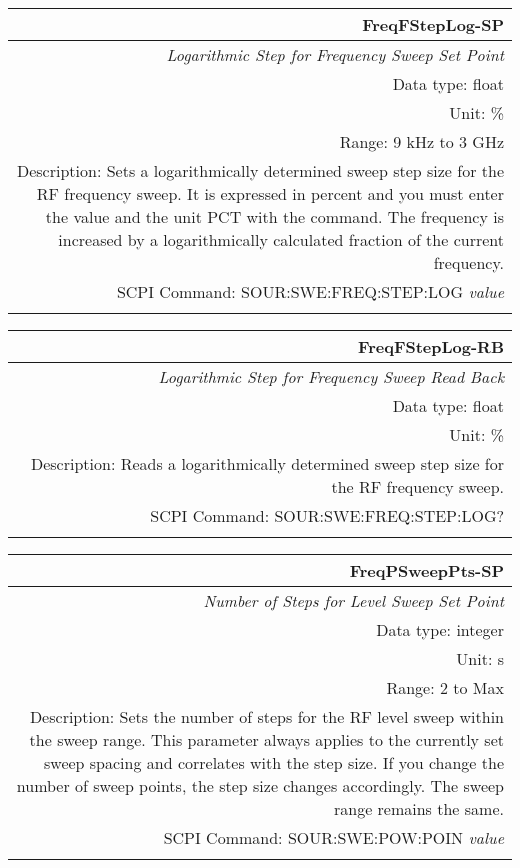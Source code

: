 \documentclass[openany]{article}
\begin{document}
		\begin{tabular}{N}
			\hline
			\bfseries FreqFStepLog-SP \\ \hline
			\emph{Logarithmic Step for Frequency Sweep Set Point} \\
			Data type: float \\
			Unit: \% \\
			Range: 9 kHz to 3 GHz \\
			Description: Sets a logarithmically determined sweep step size for the RF frequency sweep. It is expressed in percent and you must enter the value and the unit PCT with the command. The frequency is increased by a logarithmically calculated fraction of the current frequency. \\
			SCPI Command: SOUR:SWE:FREQ:STEP:LOG \emph{value} \\
			\\
			
		\end{tabular}


		\begin{tabular}{N}
			\hline
			\bfseries FreqFStepLog-RB \\ \hline
			\emph{Logarithmic Step for Frequency Sweep Read Back} \\
			Data type: float \\
			Unit: \% \\
			Description: Reads a logarithmically determined sweep step size for the RF frequency sweep. \\
			SCPI Command: SOUR:SWE:FREQ:STEP:LOG? \\
			\\

		\end{tabular}


		\begin{tabular}{N}
			\hline
			\bfseries FreqPSweepPts-SP \\ \hline
			\emph{Number of Steps for Level Sweep Set Point} \\
			Data type: integer \\
			Unit: s \\
			Range: 2 to Max \\ 
			Description: Sets the number of steps for the RF level sweep within the sweep range. This parameter always applies to the currently set sweep spacing and correlates with the step size. If you change the number of sweep points, the step size changes accordingly. The sweep range remains the same. \\
			SCPI Command: SOUR:SWE:POW:POIN \emph{value} \\
			\\
			
		\end{tabular}
\end{document}
